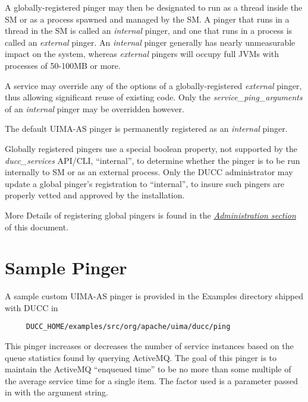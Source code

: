     A globally-registered pinger may then be designated to run as a thread inside the SM or as a
    process spawned and managed by the SM. A pinger that runs in a thread in the SM is
    called an {\em internal} pinger, and one that runs in a process is called an {\em external}
    pinger.  An {\em internal} pinger generally has nearly unmeasurable impact on the system,
    whereas {\em external} pingers will occupy full JVMs with processes of 50-100MB or more.
    
    A service may override any of the options of a globally-registered {\em external} pinger,
    thus allowing significant reuse of existing code.  Only the {\em service\_ping\_arguments} 
    of an {\em internal} pinger may be overridden however.

    The default UIMA-AS pinger is permanently registered as an {\em internal} pinger.

    Globally registered pingers use a special boolean property, not supported by the
    {\em ducc\_services} API/CLI, ``internal'', to determine whether the pinger is
    to be run internally to SM or as an external process.  Only the DUCC administrator
    may update a global pinger's registration to ``internal'', to insure such pingers
    are properly vetted and approved by the installation.

    More Details of registering global pingers is found in the 
    \hyperref[chap:sm]{\em Administration section} of this document.

\section{Sample Pinger}
    
    A sample custom UIMA-AS pinger is provided in the Examples directory shipped 
    with DUCC in
\begin{verbatim}
     DUCC_HOME/examples/src/org/apache/uima/ducc/ping
\end{verbatim}
    
    This pinger increases or decreases the number of service instances based
    on the queue statistics found by querying ActiveMQ.  The goal of this
    pinger is to maintain the ActiveMQ ``enqueued time'' to be no more than
    some multiple of the average service time for a single item.  The factor
    used is a parameter passed in with the argument string.

